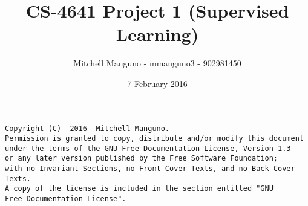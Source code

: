 

\title{CS-4641 Project 1 (Supervised Learning)}
\author{Mitchell Manguno - mmanguno3 - 902981450}
\date{7 February 2016}



\maketitle

\begin{verbatim}
Copyright (C)  2016  Mitchell Manguno.
Permission is granted to copy, distribute and/or modify this document
under the terms of the GNU Free Documentation License, Version 1.3
or any later version published by the Free Software Foundation;
with no Invariant Sections, no Front-Cover Texts, and no Back-Cover Texts.
A copy of the license is included in the section entitled "GNU
Free Documentation License".
\end{verbatim}


\pagebreak

















